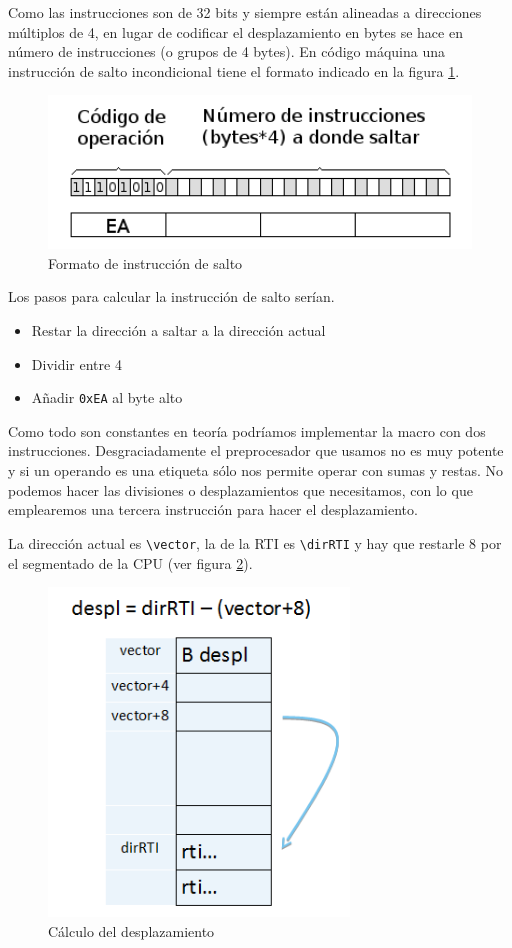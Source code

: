 Como las instrucciones son de 32 bits y siempre están alineadas a direcciones múltiplos
de 4, en lugar de codificar el desplazamiento en bytes se hace en número de
instrucciones (o grupos de 4 bytes). En código máquina una instrucción de salto
incondicional tiene el formato indicado en la figura \ref{fig:codsalto}.

\begin{figure}[h]
  \centering
    \includegraphics[width=14cm]{graphs/codsalto.png}
  \caption{Formato de instrucción de salto}
  \label{fig:codsalto}
\end{figure}

Los pasos para calcular la instrucción de salto serían.

\begin{itemize}
  \item Restar la dirección a saltar a la dirección actual
  \item Dividir entre 4
  \item Añadir {\tt 0xEA} al byte alto
\end{itemize}

Como todo son constantes en teoría podríamos implementar la
macro con dos instrucciones. Desgraciadamente el preprocesador
que usamos no es muy potente y si un operando es una etiqueta
sólo nos permite operar con sumas y restas. No podemos hacer las
divisiones o desplazamientos que necesitamos, con lo que emplearemos
una tercera instrucción para hacer el desplazamiento.

La dirección actual es {\tt \textbackslash vector}, la de la RTI
es {\tt \textbackslash dirRTI} y hay que restarle 8 por el
segmentado de la CPU (ver figura \ref{fig:saltoseg}).

\begin{figure}[h]
  \centering
    \includegraphics[width=8cm]{graphs/saltosegmentado.png}
  \caption{Cálculo del desplazamiento}
  \label{fig:saltoseg}
\end{figure}

